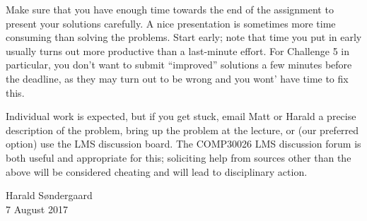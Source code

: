 \documentclass[12pt]{article}
\begin{document}
Make sure that you have enough time towards the end of the assignment
to present your solutions carefully.
A nice presentation is sometimes more time consuming than solving the
problems.
Start early; note that time you put in early usually turns out more
productive than a last-minute effort.
For Challenge 5 in particular, you don't want to submit ``improved''
solutions a few minutes before the deadline, as they may turn out
to be wrong and you wont' have time to fix this.

Individual work is expected, but if you get stuck, email Matt or Harald
a precise description of the problem, bring up the problem at the
lecture, or (our preferred option) use the LMS discussion board.
The COMP30026 LMS discussion forum is both useful and appropriate
for this;
soliciting help from sources other than the above
will be considered cheating and will lead to disciplinary action.

\begin{flushright}
Harald S{\o}ndergaard
\\ 7 August 2017
\end{flushright}
\end{document}
